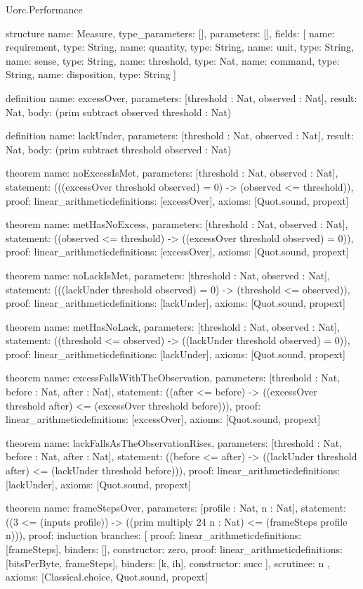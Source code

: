 \begin{lexlean}{Uorc.Performance}
\begin{semanticmodule}
structure{
  name: Measure,
  type_parameters: [],
  parameters: [],
  fields: [
    {name: requirement, type: String},
    {name: quantity, type: String},
    {name: unit, type: String},
    {name: sense, type: String},
    {name: threshold, type: Nat},
    {name: command, type: String},
    {name: disposition, type: String}
  ]
}

definition{
  name: excessOver,
  parameters: [threshold : Nat, observed : Nat],
  result: Nat,
  body: (prim subtract observed threshold : Nat)
}

definition{
  name: lackUnder,
  parameters: [threshold : Nat, observed : Nat],
  result: Nat,
  body: (prim subtract threshold observed : Nat)
}

theorem{
  name: noExcessIsMet,
  parameters: [threshold : Nat, observed : Nat],
  statement: (((excessOver threshold observed) = 0) -> (observed <= threshold)),
  proof: linear_arithmetic{definitions: [excessOver]},
  axioms: [Quot.sound, propext]
}

theorem{
  name: metHasNoExcess,
  parameters: [threshold : Nat, observed : Nat],
  statement: ((observed <= threshold) -> ((excessOver threshold observed) = 0)),
  proof: linear_arithmetic{definitions: [excessOver]},
  axioms: [Quot.sound, propext]
}

theorem{
  name: noLackIsMet,
  parameters: [threshold : Nat, observed : Nat],
  statement: (((lackUnder threshold observed) = 0) -> (threshold <= observed)),
  proof: linear_arithmetic{definitions: [lackUnder]},
  axioms: [Quot.sound, propext]
}

theorem{
  name: metHasNoLack,
  parameters: [threshold : Nat, observed : Nat],
  statement: ((threshold <= observed) -> ((lackUnder threshold observed) = 0)),
  proof: linear_arithmetic{definitions: [lackUnder]},
  axioms: [Quot.sound, propext]
}

theorem{
  name: excessFallsWithTheObservation,
  parameters: [threshold : Nat, before : Nat, after : Nat],
  statement: ((after <= before) -> ((excessOver threshold after) <= (excessOver threshold before))),
  proof: linear_arithmetic{definitions: [excessOver]},
  axioms: [Quot.sound, propext]
}

theorem{
  name: lackFallsAsTheObservationRises,
  parameters: [threshold : Nat, before : Nat, after : Nat],
  statement: ((before <= after) -> ((lackUnder threshold after) <= (lackUnder threshold before))),
  proof: linear_arithmetic{definitions: [lackUnder]},
  axioms: [Quot.sound, propext]
}

theorem{
  name: frameStepsOver,
  parameters: [profile : Nat, n : Nat],
  statement: ((3 <= (inputs profile)) -> ((prim multiply 24 n : Nat) <= (frameSteps profile n))),
  proof: induction{
    branches: [
      {proof: linear_arithmetic{definitions: [frameSteps]}, binders: [], constructor: zero},
      {
        proof: linear_arithmetic{definitions: [bitsPerByte, frameSteps]},
        binders: [k, ih],
        constructor: succ
      }
    ],
    scrutinee: n
  },
  axioms: [Classical.choice, Quot.sound, propext]
}


\end{semanticmodule}
\end{lexlean}
